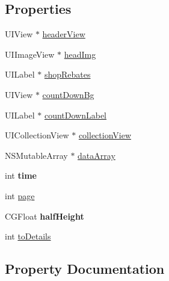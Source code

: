\subsection*{Properties}
\begin{DoxyCompactItemize}
\item 
U\+I\+View $\ast$ \mbox{\hyperlink{category_brand_sales_view_controller_07_08_ae8a682588185ed066fa73c1d93df2b71}{header\+View}}
\item 
U\+I\+Image\+View $\ast$ \mbox{\hyperlink{category_brand_sales_view_controller_07_08_a3d5a81a0e21d3454038dddc16060df3b}{head\+Img}}
\item 
U\+I\+Label $\ast$ \mbox{\hyperlink{category_brand_sales_view_controller_07_08_a88b217b38623f4d9445d54d9d5c10b26}{shop\+Rebates}}
\item 
U\+I\+View $\ast$ \mbox{\hyperlink{category_brand_sales_view_controller_07_08_a9d391a0dedaa1eb790cd8140561e70be}{count\+Down\+Bg}}
\item 
U\+I\+Label $\ast$ \mbox{\hyperlink{category_brand_sales_view_controller_07_08_ae04e4addd6ff42deabcabcf2f5c3c1dd}{count\+Down\+Label}}
\item 
U\+I\+Collection\+View $\ast$ \mbox{\hyperlink{category_brand_sales_view_controller_07_08_a121202817a6817679e7222d9fa81888d}{collection\+View}}
\item 
N\+S\+Mutable\+Array $\ast$ \mbox{\hyperlink{category_brand_sales_view_controller_07_08_a984e160c3584cbc4ac11154785085c91}{data\+Array}}
\item 
\mbox{\label{category_brand_sales_view_controller_07_08_ad8d211b81fb6a91481e0e3944bda1c46}} 
int {\bfseries time}
\item 
int \mbox{\hyperlink{category_brand_sales_view_controller_07_08_a23cfaee4e8fb918026d0e722fd00205f}{page}}
\item 
\mbox{\label{category_brand_sales_view_controller_07_08_ad26c59558b5ea95dc00846ca99b83238}} 
C\+G\+Float {\bfseries half\+Height}
\item 
int \mbox{\hyperlink{category_brand_sales_view_controller_07_08_a420c6859d8260a315b5084c680fa870b}{to\+Details}}
\end{DoxyCompactItemize}


\subsection{Property Documentation}
\mbox{\label{category_brand_sales_view_controller_07_08_a121202817a6817679e7222d9fa81888d}} 
